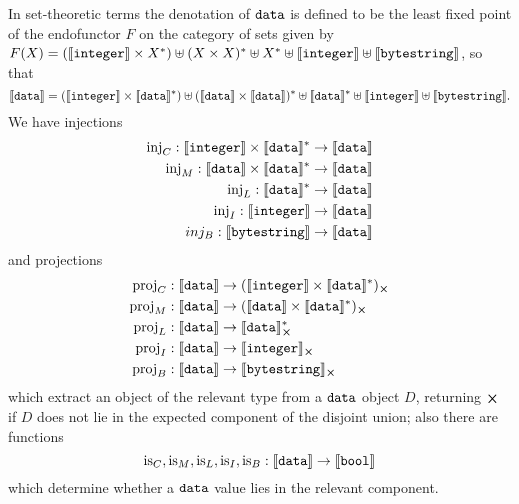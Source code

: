 \noindent In set-theoretic terms the denotation of $\mathtt{data}$ is
defined to be the least fixed point of the endofunctor $F$ on the category of
sets given by $F(X) = (\llbracket\mathit{\mathtt{integer}}\rrbracket \times X^*) \uplus (X \times X)^* \uplus
X^* \uplus \llbracket\mathit{\mathtt{integer}}\rrbracket \uplus \llbracket\mathit{\mathtt{bytestring}}\rrbracket$, so that
$$ \llbracket\mathit{\mathtt{data}}\rrbracket = (\llbracket\mathit{\mathtt{integer}}\rrbracket \times \llbracket\mathit{\mathtt{data}}\rrbracket^*)
               \uplus (\llbracket\mathit{\mathtt{data}}\rrbracket \times \llbracket\mathit{\mathtt{data}}\rrbracket)^*
               \uplus \llbracket\mathit{\mathtt{data}}\rrbracket^*
               \uplus \llbracket\mathit{\mathtt{integer}}\rrbracket
               \uplus \llbracket\mathit{\mathtt{bytestring}}\rrbracket.
$$
We have injections
\begin{align*}
  \operatorname{inj}_C: \llbracket\mathit{\mathtt{integer}}\rrbracket \times \llbracket\mathit{\mathtt{data}}\rrbracket^* & \to \llbracket\mathit{\mathtt{data}}\rrbracket \\
  \operatorname{inj}_M: \llbracket\mathit{\mathtt{data}}\rrbracket \times \llbracket\mathit{\mathtt{data}}\rrbracket^*  & \to \llbracket\mathit{\mathtt{data}}\rrbracket \\
  \operatorname{inj}_L: \llbracket\mathit{\mathtt{data}}\rrbracket^* & \to \llbracket\mathit{\mathtt{data}}\rrbracket \\
  \operatorname{inj}_I: \llbracket\mathit{\mathtt{integer}}\rrbracket & \to \llbracket\mathit{\mathtt{data}}\rrbracket \\
  inj_B: \llbracket\mathit{\mathtt{bytestring}}\rrbracket & \to \llbracket\mathit{\mathtt{data}}\rrbracket \\
\end{align*}
\noindent and projections
\begin{align*}
  \proj_C: \denote{\ty{data}} & \to \withError{(\denote{\ty{integer}} \times \denote{\ty{data}}^*)}\\
  \proj_M: \denote{\ty{data}} & \to \withError{(\denote{\ty{data}} \times \denote{\ty{data}}^*)}\\
  \proj_L: \denote{\ty{data}} & \to \withError{\denote{\ty{data}}^* }\\
  \proj_I: \denote{\ty{data}} & \to \withError{\denote{\ty{integer}}}\\
  \proj_B: \denote{\ty{data}} & \to \withError{\denote{\ty{bytestring}} }\\
\end{align*}
\noindent which extract an object of the relevant type from a $\mathtt{data}$ object
$D$, returning $\errorX$ if $D$ does not lie in the expected component of the
disjoint union; also there are functions
$$
\operatorname{is}_C, \operatorname{is}_M, \operatorname{is}_L, \operatorname{is}_I, \operatorname{is}_B: \llbracket\mathit{\mathtt{data}}\rrbracket \to \llbracket\mathit{\mathtt{bool}}\rrbracket
$$
\noindent which determine whether a $\mathtt{data}$ value lies in the relevant component.



